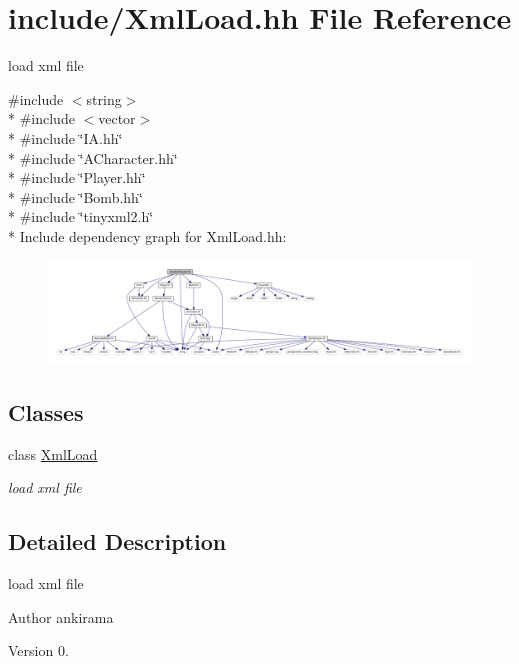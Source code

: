 \hypertarget{_xml_load_8hh}{}\section{include/\+Xml\+Load.hh File Reference}
\label{_xml_load_8hh}


load xml file  


{\ttfamily \#include $<$string$>$}\\*
{\ttfamily \#include $<$vector$>$}\\*
{\ttfamily \#include \char`\"{}I\+A.\+hh\char`\"{}}\\*
{\ttfamily \#include \char`\"{}A\+Character.\+hh\char`\"{}}\\*
{\ttfamily \#include \char`\"{}Player.\+hh\char`\"{}}\\*
{\ttfamily \#include \char`\"{}Bomb.\+hh\char`\"{}}\\*
{\ttfamily \#include \char`\"{}tinyxml2.\+h\char`\"{}}\\*
Include dependency graph for Xml\+Load.\+hh\+:
\nopagebreak
\begin{figure}[H]
\begin{center}
\leavevmode
\includegraphics[width=350pt]{_xml_load_8hh__incl}
\end{center}
\end{figure}
\subsection*{Classes}
\begin{DoxyCompactItemize}
\item 
class \hyperlink{class_xml_load}{Xml\+Load}
\begin{DoxyCompactList}\small\item\em load xml file \end{DoxyCompactList}\end{DoxyCompactItemize}


\subsection{Detailed Description}
load xml file 

\begin{DoxyAuthor}{Author}
ankirama 
\end{DoxyAuthor}
\begin{DoxyVersion}{Version}
0. 
\end{DoxyVersion}
